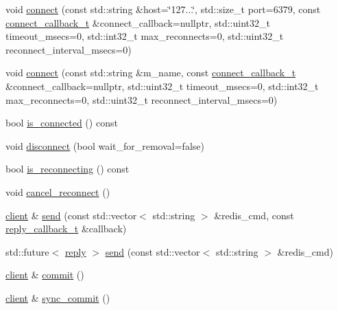 \begin{DoxyCompactItemize}
void \mbox{\hyperlink{classcpp__redis_1_1client_adda8b3e7b4f9c80ac052753b39178dd5}{connect}} (const std\+::string \&host=\char`\"{}127...\char`\"{}, std\+::size\+\_\+t port=6379, const \mbox{\hyperlink{classcpp__redis_1_1client_a8e8f308847caf0b9ce06b817253c65c7}{connect\+\_\+callback\+\_\+t}} \&connect\+\_\+callback=nullptr, std\+::uint32\+\_\+t timeout\+\_\+msecs=0, std\+::int32\+\_\+t max\+\_\+reconnects=0, std\+::uint32\+\_\+t reconnect\+\_\+interval\+\_\+msecs=0)
\item 
void \mbox{\hyperlink{classcpp__redis_1_1client_a15bcb0885129480543482a7da52af892}{connect}} (const std\+::string \&m_name, const \mbox{\hyperlink{classcpp__redis_1_1client_a8e8f308847caf0b9ce06b817253c65c7}{connect\+\_\+callback\+\_\+t}} \&connect\+\_\+callback=nullptr, std\+::uint32\+\_\+t timeout\+\_\+msecs=0, std\+::int32\+\_\+t max\+\_\+reconnects=0, std\+::uint32\+\_\+t reconnect\+\_\+interval\+\_\+msecs=0)
\item 
bool \mbox{\hyperlink{classcpp__redis_1_1client_a378682dda2753feff4c174679bd0f9d5}{is\+\_\+connected}} () const
\item 
void \mbox{\hyperlink{classcpp__redis_1_1client_a292252b61bcfdf9ad3854b54b7fe2740}{disconnect}} (bool wait\+\_\+for\+\_\+removal=false)
\item 
bool \mbox{\hyperlink{classcpp__redis_1_1client_ada3dc63edcf04c7db8ffa027bbe85da8}{is\+\_\+reconnecting}} () const
\item 
void \mbox{\hyperlink{classcpp__redis_1_1client_a0ad596a7cd553e18f75cdd78a99d1b05}{cancel\+\_\+reconnect}} ()
\item 
\mbox{\hyperlink{classcpp__redis_1_1client}{client}} \& \mbox{\hyperlink{classcpp__redis_1_1client_a490ef812b666e6d845fcacc808b87bc1}{send}} (const std\+::vector$<$ std\+::string $>$ \&redis\+\_\+cmd, const \mbox{\hyperlink{classcpp__redis_1_1client_af7a65eb21aa25230bfbb0b0203c4fc04}{reply\+\_\+callback\+\_\+t}} \&callback)
\item 
std\+::future$<$ \mbox{\hyperlink{classcpp__redis_1_1reply}{reply}} $>$ \mbox{\hyperlink{classcpp__redis_1_1client_ad6216d6587d50694c16d68e8e182b0be}{send}} (const std\+::vector$<$ std\+::string $>$ \&redis\+\_\+cmd)
\item 
\mbox{\hyperlink{classcpp__redis_1_1client}{client}} \& \mbox{\hyperlink{classcpp__redis_1_1client_a18e123faf9400013ad2f1063e5824dc0}{commit}} ()
\item 
\mbox{\hyperlink{classcpp__redis_1_1client}{client}} \& \mbox{\hyperlink{classcpp__redis_1_1client_ad7d61dadf264bcf27092d9f7f3ff1fd7}{sync\+\_\+commit}} ()

\end{DoxyCompactItemize}
